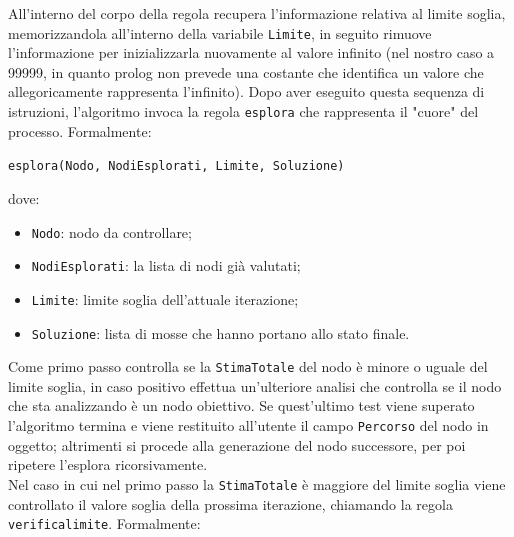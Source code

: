 \documentclass[a4paper,oneside,12pt]{book}
\def \code#1{\texttt{#1}}
\begin{document}
	All'interno del corpo della regola recupera l'informazione relativa al limite soglia, memorizzandola all'interno della variabile \code{Limite}, in seguito rimuove l'informazione per inizializzarla nuovamente al valore infinito (nel nostro caso a 99999, in quanto prolog non prevede una costante che identifica un valore che allegoricamente rappresenta l'infinito). Dopo aver eseguito questa sequenza di istruzioni, l'algoritmo invoca la regola \code{esplora} che rappresenta il "cuore" del processo. Formalmente:
	\begin{center}

		\code{esplora(Nodo, NodiEsplorati, Limite, Soluzione)}
	\end{center}
	dove:
	\begin{itemize}
		\item \code{Nodo}: nodo da controllare;
		\item \code{NodiEsplorati}: la lista di nodi già valutati;
		\item \code{Limite}: limite soglia dell'attuale iterazione;
		\item \code{Soluzione}: lista di mosse che hanno portano allo stato finale.
	\end{itemize}
	Come primo passo controlla se la \code{StimaTotale} del nodo è minore o uguale del limite soglia, in caso positivo effettua un'ulteriore analisi che controlla se il nodo che sta analizzando è un nodo obiettivo. Se quest'ultimo test viene superato l'algoritmo termina e viene restituito all'utente il campo \code{Percorso} del nodo in oggetto; altrimenti si procede alla generazione del nodo successore, per poi ripetere l'esplora ricorsivamente. \\
	Nel caso in cui nel primo passo la \code{StimaTotale} è maggiore del limite soglia viene controllato il valore soglia della prossima iterazione, chiamando la regola \code{verifica\textunderscore limite}. Formalmente:
\end{document}
